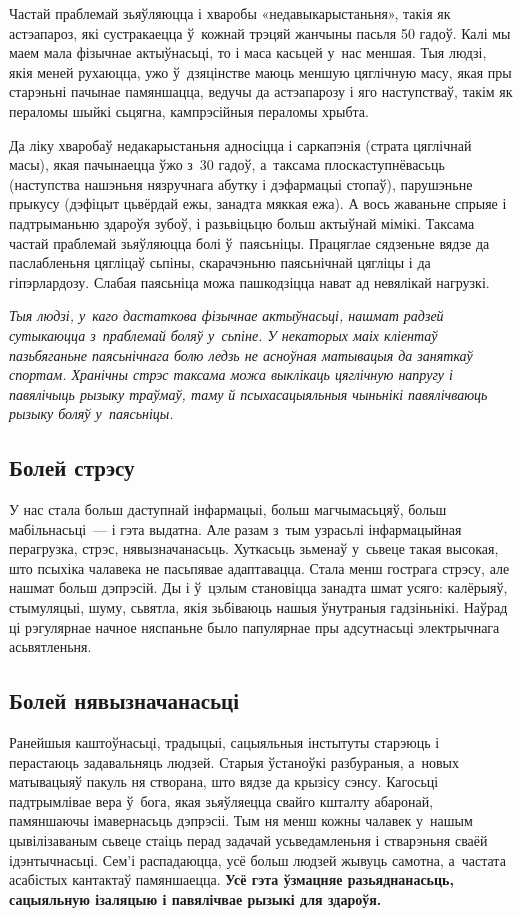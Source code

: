 Частай праблемай зьяўляюцца і хваробы «недавыкарыстаньня», такія як астэапароз, які сустракаецца ў~кожнай трэцяй жанчыны пасьля 50 гадоў. Калі мы маем мала фізычнае актыўнасьці, то і маса касьцей у~нас меншая. Тыя людзі, якія меней рухаюцца, ужо ў~дзяцінстве маюць меншую цяглічную масу, якая пры старэньні пачынае памяншацца, ведучы да астэапарозу і яго наступстваў, такім як пераломы шыйкі сьцягна, кампрэсійныя пераломы хрыбта.

Да ліку хваробаў недакарыстаньня адносіцца і саркапэнія (страта цяглічнай масы), якая пачынаецца ўжо з~30 гадоў, а~таксама плоскаступнёвасьць (наступства нашэньня нязручнага абутку і дэфармацыі стопаў), парушэньне прыкусу (дэфіцыт цьвёрдай ежы, занадта мяккая ежа). А вось жаваньне спрыяе і падтрыманьню здароўя зубоў, і разьвіцьцю больш актыўнай мімікі. Таксама частай праблемай зьяўляюцца болі ў~паясьніцы. Працяглае сядзеньне вядзе да паслабленьня цягліцаў сьпіны, скарачэньню паясьнічнай цягліцы і да гіпэрлардозу. Слабая паясьніца можа пашкодзіцца нават ад невялікай нагрузкі.

\emph{Тыя людзі, у~каго дастаткова фізычнае актыўнасьці, нашмат радзей сутыкаюцца з~праблемай боляў у~сьпіне. У некаторых маіх кліентаў пазьбяганьне паясьнічнага болю ледзь не асноўная матывацыя да заняткаў спортам. Хранічны стрэс таксама можа выклікаць цяглічную напругу і павялічыць рызыку траўмаў, таму й псыхасацыяльныя чыньнікі павялічваюць рызыку боляў у~паясьніцы.}

\subsection*{Болей стрэсу}

У нас стала больш даступнай інфармацыі, больш магчымасьцяў, больш мабільнасьці~--- і гэта выдатна. Але разам з~тым узрасьлі інфармацыйная перагрузка, стрэс, нявызначанасьць. Хуткасьць зьменаў у~сьвеце такая высокая, што псыхіка чалавека не пасьпявае адаптавацца. Стала менш гострага стрэсу, але нашмат больш дэпрэсій. Ды і ў~цэлым становіцца занадта шмат усяго: калёрыяў, стымуляцыі, шуму, сьвятла, якія зьбіваюць нашыя ўнутраныя гадзіньнікі. Наўрад ці рэгулярнае начное няспаньне было папулярнае пры адсутнасьці электрычнага асьвятленьня.

\subsection*{Болей нявызначанасьці}

Ранейшыя каштоўнасьці, традыцыі, сацыяльныя інстытуты старэюць і перастаюць задавальняць людзей. Старыя ўстаноўкі разбураныя, а~новых матывацыяў пакуль ня створана, што вядзе да крызісу сэнсу. Кагосьці падтрымлівае вера ў~бога, якая зьяўляецца свайго кшталту абаронай, памяншаючы імавернасьць дэпрэсіі. Тым ня менш кожны чалавек у~нашым цывілізаваным сьвеце стаіць перад задачай усьведамленьня і стварэньня сваёй ідэнтычнасьці. Сем'і распадаюцца, усё больш людзей жывуць самотна, а~частата асабістых кантактаў памяншаецца. \textbf{Усё гэта ўзмацняе разьяднанасьць, сацыяльную ізаляцыю і павялічвае рызыкі для здароўя.}

